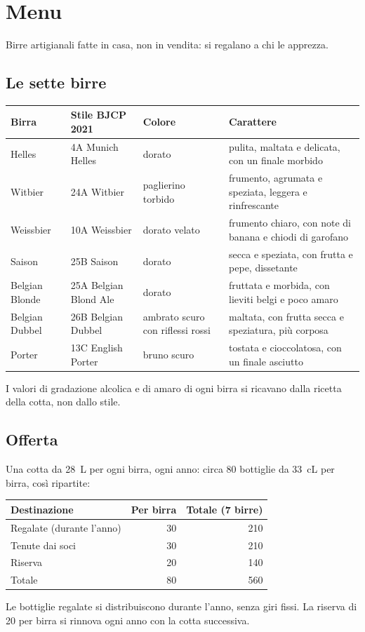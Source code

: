\section{Menu}

Birre artigianali fatte in casa, non in vendita: si regalano a chi le apprezza.

\subsection*{Le sette birre}
\begin{tabularx}{\linewidth}{@{}lllX@{}}
\toprule
Birra & Stile BJCP 2021 & Colore & Carattere \\
\midrule
Helles & 4A Munich Helles & dorato & pulita, maltata e delicata, con un finale morbido \\
Witbier & 24A Witbier & paglierino torbido & frumento, agrumata e speziata, leggera e rinfrescante \\
Weissbier & 10A Weissbier & dorato velato & frumento chiaro, con note di banana e chiodi di garofano \\
Saison & 25B Saison & dorato & secca e speziata, con frutta e pepe, dissetante \\
Belgian Blonde & 25A Belgian Blond Ale & dorato & fruttata e morbida, con lieviti belgi e poco amaro \\
Belgian Dubbel & 26B Belgian Dubbel & ambrato scuro con riflessi rossi & maltata, con frutta secca e speziatura, più corposa \\
Porter & 13C English Porter & bruno scuro & tostata e cioccolatosa, con un finale asciutto \\
\bottomrule
\end{tabularx}

I valori di gradazione alcolica e di amaro di ogni birra si ricavano dalla ricetta della cotta, non dallo stile.

\subsection*{Offerta}
Una cotta da \SI{28}{\liter} per ogni birra, ogni anno: circa \SI{80}{} bottiglie da \SI{33}{\centi\liter} per birra, così ripartite:

\begin{tabularx}{\linewidth}{@{}Xrr@{}}
\toprule
Destinazione & Per birra & Totale (7 birre) \\
\midrule
Regalate (durante l'anno) & 30 & 210 \\
Tenute dai soci & 30 & 210 \\
Riserva & 20 & 140 \\
\midrule
Totale & 80 & 560 \\
\bottomrule
\end{tabularx}

\medskip
\noindent Le bottiglie regalate si distribuiscono durante l'anno, senza giri fissi. La riserva di 20 per birra si rinnova ogni anno con la cotta successiva.
